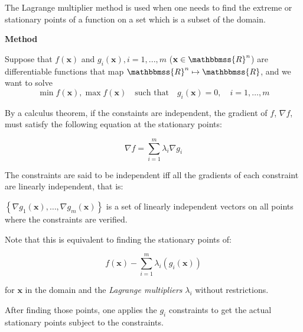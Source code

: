 \documentclass{article}
\newcommand{\R}{\mathbbmss{R}}
\begin{document}
The Lagrange multiplier method is used when one needs to find the extreme or stationary points of a function on a set which is a subset of the domain.

{\bf Method}

Suppose that $f(\mathbf{x})$ and $g_{i}(\mathbf{x}), i=1,...,m$ ($\mathbf{x}\in \R^n$) are differentiable functions that map $\R^n \mapsto \R$, and we want to solve 
$$\min f(\mathbf{x}), \max f(\mathbf{x})\quad\mbox{such that}\quad g_{i}(\mathbf{x})=0,\quad i=1,\ldots,m$$

By a calculus theorem, if the constaints are independent, the gradient of $f$, $\nabla f$, must satisfy the following equation at the stationary points:

$$\nabla f = \sum_{i=1}^{m} \lambda_{i} \nabla g_{i}$$

The constraints are said to be independent iff all the gradients of each constraint are linearly independent, that is:

$\left \{\nabla g_{1}(\mathbf{x}), \ldots, \nabla g_{m}(\mathbf{x})\right \}$ is a set of linearly independent vectors on all points where the constraints are verified.


Note that this is equivalent to finding the stationary points of:

$$f(\mathbf{x})-\sum_{i=1}^{m} \lambda_{i}( g_{i}(\mathbf{x}))$$

for $\mathbf{x}$ in the domain and the \emph{Lagrange multipliers} $\lambda_{i}$ without restrictions.

After finding those points, one applies the $g_i$ constraints to get the actual stationary points subject to the constraints.
\end{document}
